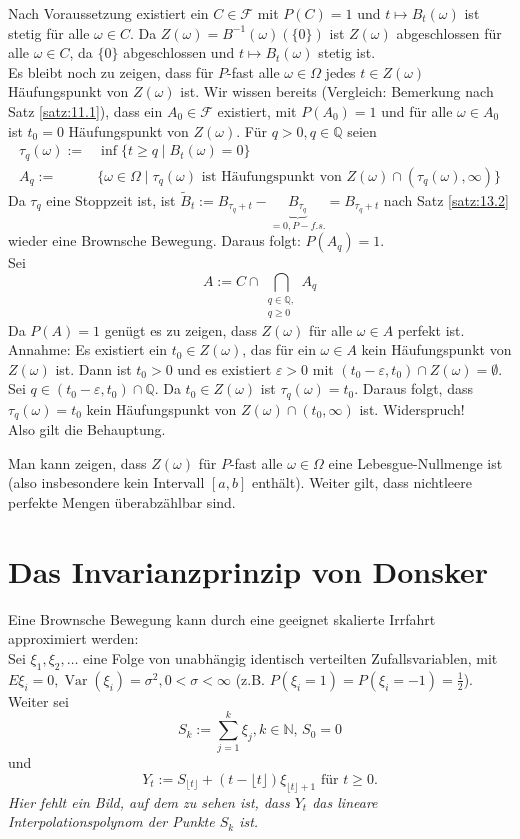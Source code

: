 \documentclass[a4paper,twoside,DIV15,BCOR12mm]{scrbook}
\begin{document}
\begin{beweis}
  Nach Voraussetzung existiert ein $C\in\mathcal F$ mit $P(C)=1$ und $t\mapsto B_t(\omega)$ ist stetig für alle $\omega\in C$. Da $Z(\omega)=B^{-1}(\omega)(\{0\})$ ist $Z(\omega)$ abgeschlossen für alle $\omega\in C$, da $\{0\}$ abgeschlossen und $t\mapsto B_t(\omega)$ stetig ist. \\
Es bleibt noch zu zeigen, dass für $P$-fast alle $\omega\in\Omega$ jedes $t\in Z(\omega)$ Häufungspunkt von $Z(\omega)$ ist. Wir wissen bereits (Vergleich: Bemerkung nach Satz \ref{satz:11.1}), dass ein $A_0\in\mathcal F$ existiert, mit $P(A_0)=1$ und für alle $\omega\in A_0$ ist $t_0=0$ Häufungspunkt von $Z(\omega)$.
Für $q>0,q\in\mathbb Q$ seien
\begin{align*}
  \tau_q(\omega):=&\inf\{t\geq q\mid B_t(\omega)=0\} \\
A_q:=&\{\omega\in\Omega\mid\tau_q(\omega)\text{ ist Häufungspunkt von $Z(\omega)\cap(\tau_q(\omega),\infty)$}\}
\end{align*}
Da $\tau_q$ eine Stoppzeit ist, ist $\tilde B_t:=B_{\tau_q+t}-\underbrace{B_{\tau_q}}_{=0, P-f.s.}=B_{\tau_q+t}$ nach Satz \ref{satz:13.2} wieder eine Brownsche Bewegung. Daraus folgt: $P(A_q)=1$.\\
Sei
\[
A:=C\cap\bigcap_{\begin{array}{c}q\in\mathbb Q,\\q\geq0\end{array}}A_q
\]
Da $P(A)=1$ genügt es zu zeigen, dass $Z(\omega)$ für alle $\omega\in A$ perfekt ist. \\
Annahme: Es existiert ein $t_0\in Z(\omega)$, das für ein $\omega\in A$ kein Häufungspunkt von $Z(\omega)$ ist. Dann ist $t_0>0$ und es existiert $\varepsilon>0$ mit $(t_0-\varepsilon,t_0)\cap Z(\omega)=\emptyset$. Sei $q\in(t_0-\varepsilon,t_0)\cap\mathbb Q$. Da $t_0\in Z(\omega)$ ist $\tau_q(\omega)=t_0$. Daraus folgt, dass $\tau_q(\omega)=t_0$ kein Häufungspunkt von $Z(\omega)\cap(t_0,\infty)$ ist. Widerspruch! \\
Also gilt die Behauptung.
\end{beweis}
\begin{bemerkung}
  Man kann zeigen, dass $Z(\omega)$ für $P$-fast alle $\omega\in\Omega$ eine Lebesgue-Nullmenge ist  (also insbesondere kein Intervall $[a,b]$ enthält). Weiter gilt, dass nichtleere perfekte Mengen überabzählbar sind.
\end{bemerkung}

\section{Das Invarianzprinzip von Donsker}
Eine Brownsche Bewegung kann durch eine geeignet skalierte Irrfahrt approximiert werden: \\
Sei $\xi_1,\xi_2,\dots$ eine Folge von unabhängig identisch verteilten Zufallsvariablen, mit $E\xi_i=0, \operatorname{Var}(\xi_i)=\sigma^2,0<\sigma<\infty$ (z.B. $P(\xi_i=1)=P(\xi_i=-1)=\frac{1}{2}$). Weiter sei
\[
S_k:=\sum_{j=1}^k\xi_j,k\in\mathbb N,\,S_0=0
\]
und
\[
Y_t:=S_{\lfloor t\rfloor}+(t-\lfloor t\rfloor)\xi_{\lfloor t\rfloor+1}\text{ für }t\geq0.
\]
\emph{Hier fehlt ein Bild, auf dem zu sehen ist, dass $Y_t$ das lineare Interpolationspolynom der Punkte $S_k$ ist.}
\end{document}
